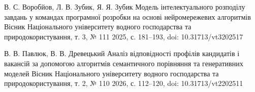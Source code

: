 \bibitemieee
{В. С. Воробйов, Л. В. Зубик, Я. Я. Зубик}
{Модель інтелектуального розподілу завдань у командах програмної розробки на основі нейромережевих алгоритмів}
{Вісник Національного університету водного господарства та природокористування, т. 3, № 111}
{2025, с. 181--193, doi: 10.31713/vt3202517}

\bibitemieee
{В. В. Павлюк, В. В. Древецький}
{Аналіз відповідності профілів кандидатів і вакансій за допомогою алгоритмів семантичного порівняння та генеративних моделей}
{Вісник Національного університету водного господарства та природокористування, т. 2, № 110}
{2026, с. 112--120, doi: 10.31713/vt2202511}

\closeCustomBibliography
